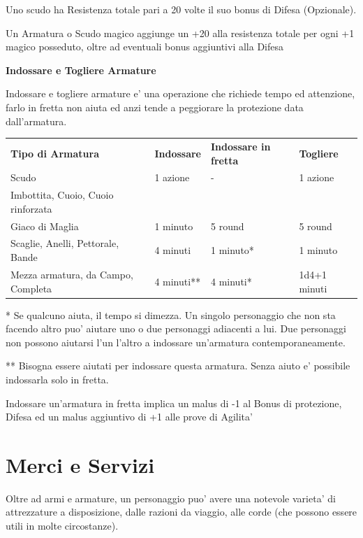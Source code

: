 \documentclass[a4paper,11pt,twoside,openany]{book}
\begin{document}
{		Uno scudo ha Resistenza totale pari a 20 volte il suo bonus di Difesa (Opzionale).
		
		\bigskip
		
		Un Armatura o Scudo magico aggiunge un +20 alla resistenza totale
		per ogni +1 magico posseduto, oltre ad eventuali bonus aggiuntivi
		alla Difesa 
		
		\bigskip
		\textbf{Indossare e Togliere Armature}
		\bigskip
		
		Indossare e togliere armature e' una operazione che richiede tempo ed attenzione, farlo in fretta non aiuta ed anzi tende a peggiorare la protezione data dall'armatura.
		
		\bigskip
		
		\begin{tabular}{llll}
			\toprule
			\textbf{Tipo di Armatura} & \textbf{Indossare} & \textbf{Indossare in fretta} & \textbf{Togliere}\tabularnewline
			Scudo & 1 azione & - & 1 azione\tabularnewline
			Imbottita, Cuoio, Cuoio rinforzata\\
			Giaco di Maglia & 1 minuto & 5 round & 5 round\tabularnewline
			Scaglie, Anelli, Pettorale, Bande & 4 minuti & 1 minuto{*} & 1 minuto\tabularnewline
			Mezza armatura, da Campo, Completa & 4 minuti{*}{*} & 4 minuti{*} & 1d4+1 minuti\tabularnewline
			
		\end{tabular}
		
		\bigskip
		
		{*} Se qualcuno aiuta, il tempo si dimezza. Un singolo personaggio che non sta facendo altro puo' aiutare uno o due personaggi adiacenti a lui. Due personaggi non possono aiutarsi l'un l'altro a indossare un'armatura contemporaneamente.
		
		{*}{*} Bisogna essere aiutati per indossare questa armatura. Senza aiuto e' possibile indossarla solo in fretta.
		
		Indossare un'armatura in fretta implica un malus di -1 al Bonus di protezione, Difesa ed un malus aggiuntivo di +1 alle prove di Agilita'
		
		\pagebreak
		
		\section{Merci e Servizi}
		
		\label{merci-e-servizi}
		
		Oltre ad armi e armature, un personaggio puo' avere una notevole varieta' di attrezzature a disposizione, dalle razioni da viaggio, alle corde (che possono essere utili in molte circostanze). 
		
}
\end{document}
